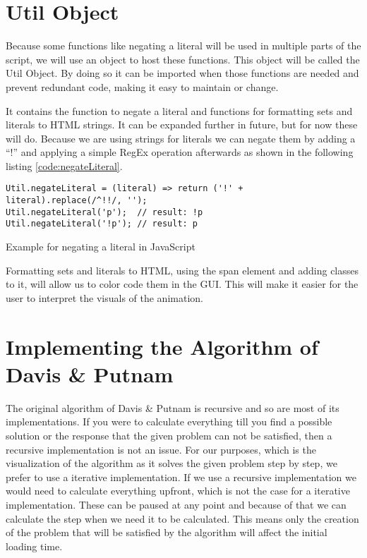 \section{Util Object}
\label{sec:impUtil}
Because some functions like negating a literal will be used in multiple parts of the script, we will use an object to host these functions. This object will be called the Util Object. By doing so it can be imported when those functions are needed and prevent redundant code, making it easy to maintain or change.

It contains the function to negate a literal and functions for formatting sets and literals to HTML strings. It can be expanded further in future, but for now these will do.
Because we are using strings for literals we can negate them by adding a ``!'' and applying a simple RegEx operation afterwards as shown in the following listing \ref{code:negateLiteral}.

\begin{listing}[h!]
\begin{verbatim}
Util.negateLiteral = (literal) => return ('!' + literal).replace(/^!!/, '');
Util.negateLiteral('p');  // result: !p
Util.negateLiteral('!p'); // result: p
\end{verbatim}
    \caption{Example for negating a literal in JavaScript}
    \label{code:negateLiteral}
\end{listing}

Formatting sets and literals to HTML, using the span element and adding classes to it, will allow us to color code them in the GUI. This will make it easier for the user to interpret the visuals of the animation.

\section{Implementing the Algorithm of Davis \& Putnam}
\label{sec:impDavisPutnam}
The original algorithm of Davis \& Putnam is recursive and so are most of its implementations. If you were to calculate everything till you find a possible solution or the response that the given problem can not be satisfied, then a recursive implementation is not an issue. For our purposes, which is the visualization of the algorithm as it solves the given problem step by step, we prefer to use a iterative implementation. If we use a recursive implementation we would need to calculate everything upfront, which is not the case for a iterative implementation. These can be paused at any point and because of that we can calculate the step when we need it to be calculated. This means only the creation of the problem that will be satisfied by the algorithm will affect the initial loading time.

